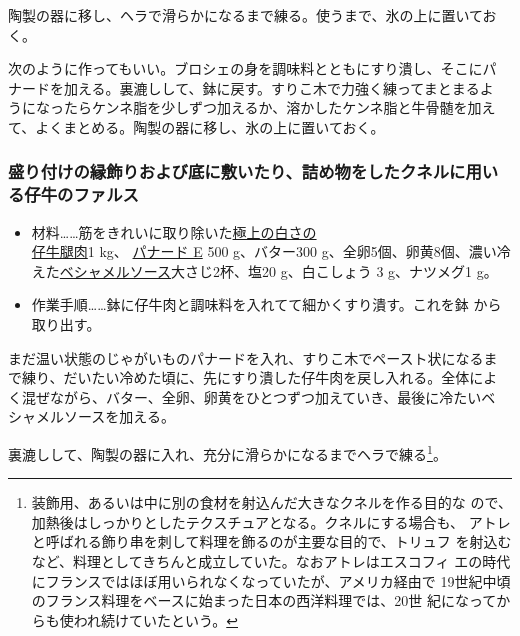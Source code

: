 \begin{recette}
陶製の器に移し、ヘラで滑らかになるまで練る。使うまで、氷の上に置いてお
く。

次のように作ってもいい。ブロシェの身を調味料とともにすり潰し、そこにパ
ナードを加える。裏漉しして、鉢に戻す。すりこ木で力強く練ってまとまるよ
うになったらケンネ脂を少しずつ加えるか、溶かしたケンネ脂と牛骨髄を加え
て、よくまとめる。陶製の器に移し、氷の上に置いておく。

\hypertarget{farce-de-veau-pour-bordures}{%
\subsubsection{盛り付けの縁飾りおよび底に敷いたり、詰め物をしたクネルに用いる仔牛のファルス}\label{farce-de-veau-pour-bordures}}



\begin{itemize}
\item
  材料\ldots{}\ldots{}筋をきれいに取り除いた\ul{極上の白さの\\仔牛腿肉}1
  kg、 \protect\hyperlink{panade-e}{パナード E} 500 g、バター300
  g、全卵5個、卵黄8個、濃い冷
  えた\protect\hyperlink{sauce-bechamel}{ベシャメルソース}大さじ2杯、塩20
  g、白こしょう 3 g、ナツメグ1 g。
\item
  作業手順\ldots{}\ldots{}鉢に仔牛肉と調味料を入れてて細かくすり潰す。これを鉢
  から取り出す。
\end{itemize}

まだ温い状態のじゃがいものパナードを入れ、すりこ木でペースト状になるま
で練り、だいたい冷めた頃に、先にすり潰した仔牛肉を戻し入れる。全体によ
く混ぜながら、バター、全卵、卵黄をひとつずつ加えていき、最後に冷たいベ
シャメルソースを加える。

裏漉しして、陶製の器に入れ、充分に滑らかになるまでヘラで練る\footnote{装飾用、あるいは中に別の食材を射込んだ大きなクネルを作る目的な
  ので、加熱後はしっかりとしたテクスチュアとなる。クネルにする場合も、
  アトレと呼ばれる飾り串を刺して料理を飾るのが主要な目的で、トリュフ
  を射込むなど、料理としてきちんと成立していた。なおアトレはエスコフィ
  エの時代にフランスではほぼ用いられなくなっていたが、アメリカ経由で
  19世紀中頃のフランス料理をベースに始まった日本の西洋料理では、20世
  紀になってからも使われ続けていたという。}。


\end{recette}

